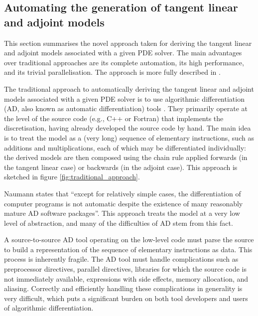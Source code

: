 \documentclass{siamltex}
\begin{document}
\subsection{Automating the generation of tangent linear and adjoint models} \label{sec:adjoints}
This section summarises the novel approach taken for deriving the tangent linear and adjoint models associated with a given
PDE solver. The main advantages over traditional approaches are its complete automation, its high performance, and its
trivial parallelisation. The approach is more fully described in \cite{farrell2012b}.

The traditional approach to automatically deriving the tangent linear and adjoint models associated with a given
PDE solver is to use algorithmic differentiation (AD, also known as automatic differentiation) tools  \cite{griewank2008,naumann2011}.
They primarily operate at the level of the source code (e.g., C++ or Fortran) that implements the discretisation, having already developed the
source code by hand. The main idea
is to treat the model as a (very long) sequence of elementary instructions, such as additions and multiplications, each of
which may be differentiated individually: the derived models are then composed using the chain rule applied forwards (in the
tangent linear case) or backwards (in the adjoint case). This approach is sketched in figure \ref{fig:traditional_approach}.

Naumann \cite{naumann2011} states that ``except for relatively simple cases, the differentiation
of computer programs is not automatic despite the existence of many reasonably mature AD software packages''.
This approach treats the model at a very low level of abstraction, and many of the difficulties of AD
stem from this fact. 

A source-to-source AD tool operating on the low-level code must parse the source to build a
representation of the sequence of elementary instructions as data.
This process is inherently fragile. The AD tool must handle complications such as preprocessor directives,
parallel directives, libraries for which the source code is not immediately available, expressions with
side effects, memory allocation, and aliasing. Correctly and efficiently handling these complications in
generality is very difficult, which puts a significant burden on both tool developers and users of algorithmic
differentiation.
\end{document}
